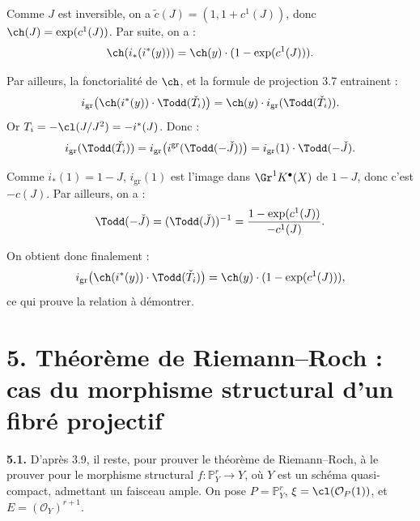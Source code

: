Comme \(J\) est inversible, on a \(\widetilde c(J)=(1,1+c^1(J))\), donc \(\ch(J)=\exp(c^1(J))\).
Par suite, on a :
\[
 \ch(i_*(i^*(y)))=\ch(y)\cdot(1-\exp(c^1(J))).
\]

Par ailleurs, la fonctorialité de \(\ch\), et la formule de projection 3.7 entrainent :
\[
 i_{\mathrm{gr}}\bigl(\ch(i^*(y))\cdot\Todd(\check T_i)\bigr)
 =
 \ch(y)\cdot i_{\mathrm{gr}}(\Todd(\check T_i)).
\]
Or \(T_i=-\cl(J/J^2)=-i^*(J)\). Donc :
\[
 i_{\mathrm{gr}}(\Todd(\check T_i))
 =
 i_{\mathrm{gr}}\bigl(i^{\mathrm{gr}}(\Todd(-\check J))\bigr)
 =
 i_{\mathrm{gr}}(1)\cdot\Todd(-\check J).
\]

Comme \(i_*(1)=1-J\), \(i_{\mathrm{gr}}(1)\) est l'image dans \(\Gr^1K^{\bullet}(X)\) de \(1-J\), donc c'est \(-c(J)\). Par ailleurs, on a :
\[
 \Todd(-\check J)=(\Todd(\check J))^{-1}
 =
 \frac{1-\exp(c^1(J))}{-c^1(J)}.
\]

On obtient donc finalement :
\[
 i_{\mathrm{gr}}\bigl(\ch(i^*(y))\cdot\Todd(\check T_i)\bigr)
 =
 \ch(y)\cdot(1-\exp(c^1(J))),
\]
ce qui prouve la relation à démontrer.

\section*{5. Théorème de Riemann--Roch : cas du morphisme structural d'un fibré projectif}

\textbf{5.1.} D'après 3.9, il reste, pour prouver le théorème de Riemann--Roch, à le prouver pour le morphisme structural \(f:\mathbb P^r_Y\longrightarrow Y\), où \(Y\) est un schéma quasi-compact, admettant un faisceau ample. On pose \(P=\mathbb P^r_Y\), \(\xi=\cl(\mathcal O_P(1))\), et \(E=(\mathcal O_Y)^{r+1}\).


